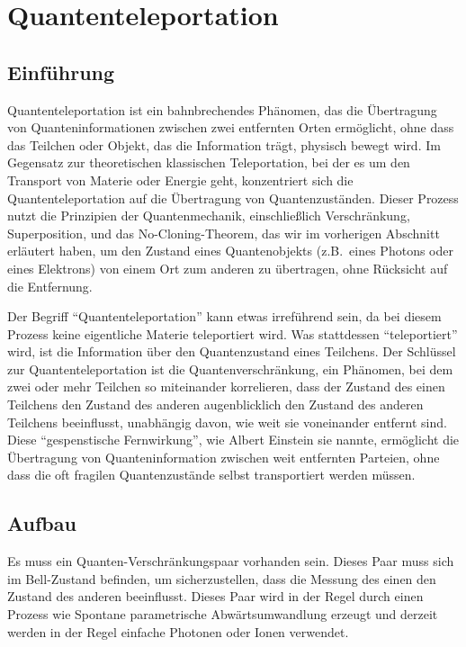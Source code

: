 \section{Quantenteleportation}\label{sec:quantum-teleportation}

\subsection{Einführung}\label{subsec:introduction}
Quantenteleportation ist ein bahnbrechendes Phänomen, das die Übertragung von Quanteninformationen
zwischen zwei entfernten Orten ermöglicht, ohne dass das Teilchen oder Objekt, das die Information trägt, physisch bewegt wird.
Im Gegensatz zur theoretischen klassischen Teleportation, bei der es um den Transport von Materie oder Energie geht,
konzentriert sich die Quantenteleportation auf die Übertragung von Quantenzuständen.
Dieser Prozess nutzt die Prinzipien der Quantenmechanik, einschließlich Verschränkung, Superposition,
und das No-Cloning-Theorem, das wir im vorherigen Abschnitt erläutert haben,
um den Zustand eines Quantenobjekts (z.B.\ eines Photons oder eines Elektrons) von einem Ort zum anderen zu übertragen,
ohne Rücksicht auf die Entfernung.

Der Begriff ``Quantenteleportation'' kann etwas irreführend sein, da bei diesem Prozess keine eigentliche Materie teleportiert wird.
Was stattdessen ``teleportiert'' wird, ist die Information über den Quantenzustand eines Teilchens.
Der Schlüssel zur Quantenteleportation ist die Quantenverschränkung,
ein Phänomen, bei dem zwei oder mehr Teilchen so miteinander korrelieren, dass der Zustand des einen Teilchens den Zustand des anderen augenblicklich
den Zustand des anderen Teilchens beeinflusst, unabhängig davon, wie weit sie voneinander entfernt sind.
Diese ``gespenstische Fernwirkung'', wie Albert Einstein sie nannte,
ermöglicht die Übertragung von Quanteninformation zwischen weit entfernten Parteien, ohne dass die oft fragilen Quantenzustände selbst transportiert werden müssen.

\subsection{Aufbau}\label{subsec:setup}

Es muss ein Quanten-Verschränkungspaar vorhanden sein.
Dieses Paar muss sich im Bell-Zustand\cite{quantuminfocambridge} befinden, um sicherzustellen, dass die Messung des einen den Zustand des anderen beeinflusst.
Dieses Paar wird in der Regel durch einen Prozess wie
Spontane parametrische Abwärtsumwandlung\cite{couteau2018spontaneous} erzeugt und derzeit
werden in der Regel einfache Photonen oder Ionen verwendet.


